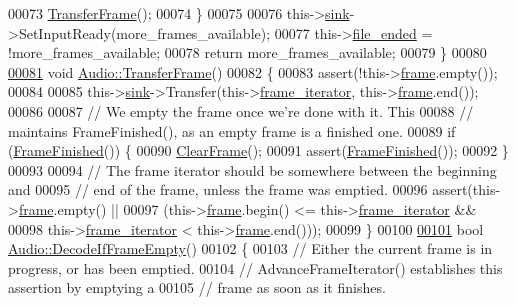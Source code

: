 \begin{DoxyCode}
00073         \hyperlink{classAudio_a9657995aa27bef00b6880f5a7bafd629}{TransferFrame}();
00074     \}
00075 
00076     this->\hyperlink{classAudio_ae7dddd283486a0d1555e9bc6a0d63cff}{sink}->SetInputReady(more\_frames\_available);
00077     this->\hyperlink{classAudio_acec4f6ef3a89f170bdaed5670efd092c}{file\_ended} = !more\_frames\_available;
00078     \textcolor{keywordflow}{return} more\_frames\_available;
00079 \}
00080 
\hypertarget{audio_8cpp_source_l00081}{}\hyperlink{classAudio_a9657995aa27bef00b6880f5a7bafd629}{00081} \textcolor{keywordtype}{void} \hyperlink{classAudio_a9657995aa27bef00b6880f5a7bafd629}{Audio::TransferFrame}()
00082 \{
00083     assert(!this->\hyperlink{classAudio_a0c734b8fe7eb8f80b3985ee0c638f982}{frame}.empty());
00084 
00085     this->\hyperlink{classAudio_ae7dddd283486a0d1555e9bc6a0d63cff}{sink}->Transfer(this->\hyperlink{classAudio_a9d605091cc66ccfe9f5ae149c9181ba4}{frame\_iterator}, this->\hyperlink{classAudio_a0c734b8fe7eb8f80b3985ee0c638f982}{frame}.end());
00086 
00087     \textcolor{comment}{// We empty the frame once we're done with it.  This}
00088     \textcolor{comment}{// maintains FrameFinished(), as an empty frame is a finished one.}
00089     \textcolor{keywordflow}{if} (\hyperlink{classAudio_afab4e39f1e74e9a20ab456da2944a3aa}{FrameFinished}()) \{
00090         \hyperlink{classAudio_ad35726949e5de23e62024eba476c7ecf}{ClearFrame}();
00091         assert(\hyperlink{classAudio_afab4e39f1e74e9a20ab456da2944a3aa}{FrameFinished}());
00092     \}
00093 
00094     \textcolor{comment}{// The frame iterator should be somewhere between the beginning and}
00095     \textcolor{comment}{// end of the frame, unless the frame was emptied.}
00096     assert(this->\hyperlink{classAudio_a0c734b8fe7eb8f80b3985ee0c638f982}{frame}.empty() ||
00097            (this->\hyperlink{classAudio_a0c734b8fe7eb8f80b3985ee0c638f982}{frame}.begin() <= this->\hyperlink{classAudio_a9d605091cc66ccfe9f5ae149c9181ba4}{frame\_iterator} &&
00098             this->\hyperlink{classAudio_a9d605091cc66ccfe9f5ae149c9181ba4}{frame\_iterator} < this->\hyperlink{classAudio_a0c734b8fe7eb8f80b3985ee0c638f982}{frame}.end()));
00099 \}
00100 
\hypertarget{audio_8cpp_source_l00101}{}\hyperlink{classAudio_a3d7e118920b983906dc915428242df2e}{00101} \textcolor{keywordtype}{bool} \hyperlink{classAudio_a3d7e118920b983906dc915428242df2e}{Audio::DecodeIfFrameEmpty}()
00102 \{
00103     \textcolor{comment}{// Either the current frame is in progress, or has been emptied.}
00104     \textcolor{comment}{// AdvanceFrameIterator() establishes this assertion by emptying a}
00105     \textcolor{comment}{// frame as soon as it finishes.}

\end{DoxyCode}
